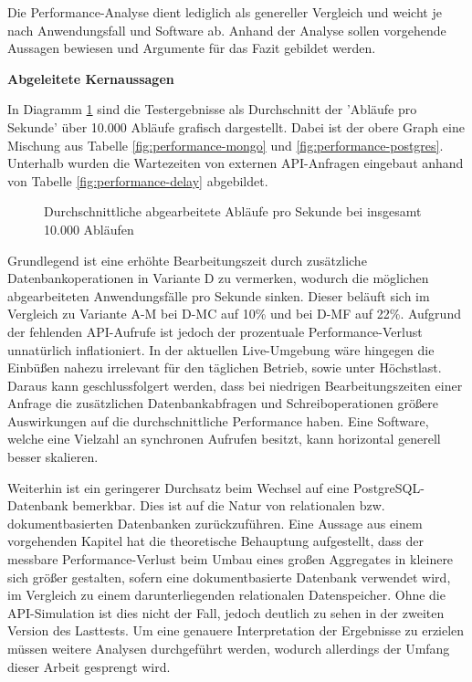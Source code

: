Die Performance-Analyse dient lediglich als genereller Vergleich und weicht je nach Anwendungsfall und Software ab. Anhand der Analyse sollen vorgehende Aussagen bewiesen und Argumente für das Fazit gebildet werden.

\textbf{Abgeleitete Kernaussagen}

In Diagramm \ref{fig:Performance} sind die Testergebnisse als Durchschnitt der 'Abläufe pro Sekunde' über 10.000 Abläufe grafisch dargestellt. Dabei ist der obere Graph eine Mischung aus Tabelle \ref{fig:performance-mongo} und \ref{fig:performance-postgres}. Unterhalb wurden die Wartezeiten von externen API-Anfragen eingebaut anhand von Tabelle \ref{fig:performance-delay} abgebildet.

\begin{figure}[t]
	\centering
	\small
	
	\caption{Durchschnittliche abgearbeitete Abläufe pro Sekunde bei insgesamt 10.000 Abläufen}
	\label{fig:Performance}
\end{figure}

Grundlegend ist eine erhöhte Bearbeitungszeit durch zusätzliche Datenbankoperationen in Variante D zu vermerken, wodurch die möglichen abgearbeiteten Anwendungsfälle pro Sekunde sinken.  Dieser beläuft sich im Vergleich zu Variante A-M bei D-MC auf 10\% und bei D-MF auf 22\%. Aufgrund der fehlenden API-Aufrufe ist jedoch der prozentuale Performance-Verlust unnatürlich inflationiert. In der aktuellen Live-Umgebung wäre hingegen die Einbüßen nahezu irrelevant für den täglichen Betrieb, sowie unter Höchstlast. Daraus kann geschlussfolgert werden, dass bei niedrigen Bearbeitungszeiten einer Anfrage die zusätzlichen Datenbankabfragen und Schreiboperationen größere Auswirkungen auf die durchschnittliche Performance haben. Eine Software, welche eine Vielzahl an synchronen Aufrufen besitzt, kann horizontal generell besser skalieren.

Weiterhin ist ein geringerer Durchsatz beim Wechsel auf eine PostgreSQL-Datenbank bemerkbar. Dies ist auf die Natur von relationalen bzw. dokumentbasierten Datenbanken zurückzuführen. Eine Aussage aus einem vorgehenden Kapitel hat die theoretische Behauptung aufgestellt, dass der messbare Performance-Verlust beim Umbau eines großen Aggregates in kleinere sich größer gestalten, sofern eine dokumentbasierte Datenbank verwendet wird, im Vergleich zu einem darunterliegenden relationalen Datenspeicher. Ohne die API-Simulation ist dies nicht der Fall, jedoch deutlich zu sehen in der zweiten Version des Lasttests. Um eine genauere Interpretation der Ergebnisse zu erzielen müssen weitere Analysen durchgeführt werden, wodurch allerdings der Umfang dieser Arbeit gesprengt wird.

